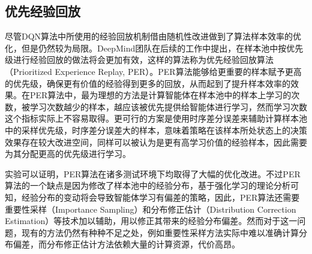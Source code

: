 \subsection{优先经验回放}

尽管DQN算法中所使用的经验回放机制借由随机性改进做到了算法样本效率的优化，但是仍然较为局限。DeepMind团队在后续的工作中提出，在样本池中按优先级进行经验回放的做法将会更加有效，这样的算法称为优先经验回放算法（Prioritized Experience Replay, PER）。PER算法能够给更重要的样本赋予更高的优先级，确保更有价值的经验得到更多的回放，从而起到了提升样本效率的效果。在PER算法中，最为理想的方法是计算智能体在样本池中的样本上学习的次数，被学习次数越少的样本，越应该被优先提供给智能体进行学习，然而学习次数这个指标实际上不容易取得。更可行的方案是使用时序差分误差来辅助计算样本池中的采样优先级，时序差分误差大的样本，意味着策略在该样本所处状态上的决策效果存在较大改进空间，同样可以被认为是更有高学习价值的经验样本，因此需要为其分配更高的优先级进行学习。

实验可以证明，PER算法在诸多测试环境下均取得了大幅的优化改进。不过PER算法的一个缺点是因为修改了样本池中的经验分布，基于强化学习的理论分析可知，经验分布的变动将会导致智能体学习有偏差的策略，因此，PER算法还需要重要性采样（Importance Sampling）和分布修正估计（Distribution Correction Estimation）等技术加以辅助，用以修正其带来的经验分布偏差。然而对于这一问题，现有的方法仍然有种种不足之处，例如重要性采样方法实际中难以准确计算分布偏差，而分布修正估计方法依赖大量的计算资源，代价高昂。




